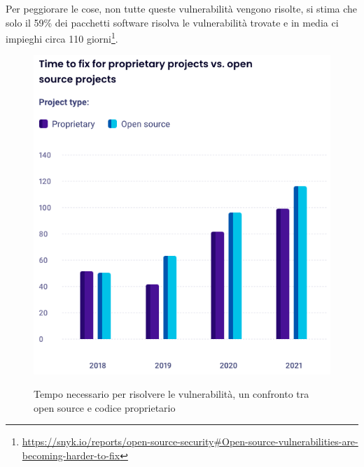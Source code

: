 Per peggiorare le cose, non tutte queste vulnerabilità vengono risolte, si stima che solo il 59\% dei pacchetti software
risolva le vulnerabilità trovate e in media ci impieghi circa 110
giorni\footnote{\url{https://snyk.io/reports/open-source-security\#Open-source-vulnerabilities-are-becoming-harder-to-fix}}.
\begin{figure}[h]
    \centering
    \captionsetup{justification=centering}
    \includegraphics[width=12cm]{./chapters/2.wasi-in-depth/images/12.time_to_fix_os_sec.png}
    \label{time_to_fix_security}
    \caption{Tempo necessario per risolvere le vulnerabilità, un confronto tra open source e codice proprietario}
\end{figure}
